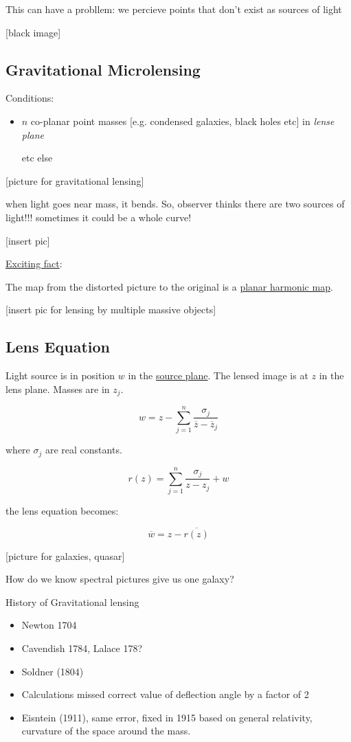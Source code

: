 \documentclass{article}
\theoremstyle{definition}
\begin{document}
This can have a probllem: we percieve points that don't exist as sources of light

    [black image]

\subsection*{Gravitational Microlensing}

Conditions:

\begin{itemize}
    \item \(n\) co-planar point masses [e.g. condensed galaxies, black holes etc] in \textit{lense plane}

          etc else
\end{itemize}

[picture for gravitational lensing]

when light goes near mass, it bends. So, observer thinks there are two sources of light!!! sometimes it could be a whole curve!

[insert pic]

\underline{Exciting fact}:

The map from the distorted picture to the original is a \underline{planar harmonic map}.

[insert pic for lensing by multiple massive objects]

\subsection*{Lens Equation}

Light source is in position \(w\) in the \underline{source plane}. The lensed image is at \(z\) in the lens plane. Masses are in \(z_j\).

\[
    w = z - \sum_{j=1}^n \frac{\sigma_j}{\overline{z} - \overline{z}_j}
\]

where \(\sigma_j\) are real constants.

\[
    r(z) = \sum_{j=1}^n \frac{\sigma_j}{z -z_j} + w
\]

the lens equation becomes:

\[
    \overline{w} = z -\overline{r(z)}
\]

[picture for galaxies, quasar]

How do we know spectral pictures give us one galaxy?

History of Gravitational lensing

\begin{itemize}
    \item Newton 1704
    \item Cavendish 1784, Lalace 178?
    \item Soldner (1804)
    \item Calculations missed correct value of deflection angle by a factor of 2
    \item Eisntein (1911), same error, fixed in 1915 based on general relativity, curvature of the space around the mass.
\end{itemize}
\end{document}
